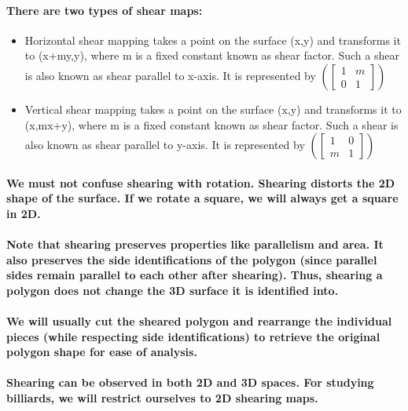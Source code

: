 \documentclass{report}
\begin{document}
\paragraph{There are two types of shear maps:}

\begin{itemize}
\item Horizontal shear mapping takes a point on the surface (x,y) and transforms it to (x+my,y), where m is a fixed constant known as shear factor. Such a shear is also known as shear parallel to x-axis. It is represented by 
$ (\begin{bmatrix}
1&m\\0&1
\end{bmatrix})$ 

\item Vertical shear mapping takes a point on the surface (x,y) and transforms it to (x,mx+y), where m is a fixed constant known as shear factor. Such a shear is also known as shear parallel to y-axis. It is represented by
$ (\begin{bmatrix}
1&0\\m&1
\end{bmatrix})$ 
\end{itemize}

\paragraph{We must not confuse shearing with rotation. Shearing distorts the 2D shape of the surface. If we rotate a square, we will always get a square in 2D.}

\paragraph{Note that shearing preserves properties like parallelism and area. It also preserves the side identifications of the polygon (since parallel sides remain parallel to each other after shearing). Thus, shearing a polygon does not change the 3D surface it is identified into.}

\paragraph{We will usually cut the sheared polygon and rearrange the individual pieces (while respecting side identifications) to retrieve the original polygon shape for ease of analysis.}

\paragraph{Shearing can be observed in both 2D and 3D spaces. For studying billiards, we will restrict ourselves to 2D shearing maps.}
\end{document}
